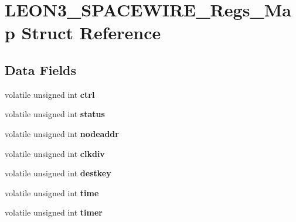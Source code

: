 \hypertarget{structLEON3__SPACEWIRE__Regs__Map}{}\section{L\+E\+O\+N3\+\_\+\+S\+P\+A\+C\+E\+W\+I\+R\+E\+\_\+\+Regs\+\_\+\+Map Struct Reference}
\label{structLEON3__SPACEWIRE__Regs__Map}
\subsection*{Data Fields}
\begin{DoxyCompactItemize}
\item 
\mbox{\label{structLEON3__SPACEWIRE__Regs__Map_a9708cb64b9838144802fbe2457458a8b}} 
volatile unsigned int {\bfseries ctrl}
\item 
\mbox{\label{structLEON3__SPACEWIRE__Regs__Map_a3a9a3876fc1f84c6508c130898c42b3c}} 
volatile unsigned int {\bfseries status}
\item 
\mbox{\label{structLEON3__SPACEWIRE__Regs__Map_aa270cd7b1ac12669f28283e334662a90}} 
volatile unsigned int {\bfseries nodeaddr}
\item 
\mbox{\label{structLEON3__SPACEWIRE__Regs__Map_a5396678f95888102a77506985e624ca9}} 
volatile unsigned int {\bfseries clkdiv}
\item 
\mbox{\label{structLEON3__SPACEWIRE__Regs__Map_a54f70933a25fd3002e48a31687682ea0}} 
volatile unsigned int {\bfseries destkey}
\item 
\mbox{\label{structLEON3__SPACEWIRE__Regs__Map_a15c306071e64e873cfd7821eb72f986b}} 
volatile unsigned int {\bfseries time}
\item 
\mbox{\label{structLEON3__SPACEWIRE__Regs__Map_abef639e6606e2094ee806f4942c9892c}} 
volatile unsigned int {\bfseries timer}
\item 
\mbox{\label{structLEON3__SPACEWIRE__Regs__Map_abb8fa3ebe0c2e0c45954a25d38323b72}} 

\end{DoxyCompactItemize}
